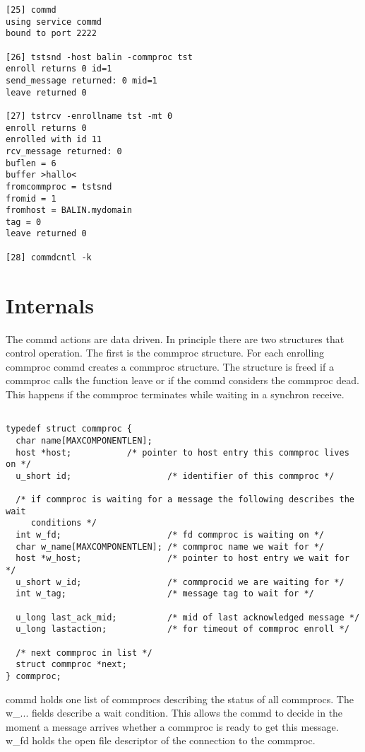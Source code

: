 \begin{verbatim}
[25] commd
using service commd
bound to port 2222

[26] tstsnd -host balin -commproc tst
enroll returns 0 id=1
send_message returned: 0 mid=1
leave returned 0

[27] tstrcv -enrollname tst -mt 0
enroll returns 0
enrolled with id 11
rcv_message returned: 0
buflen = 6
buffer >hallo<
fromcommproc = tstsnd
fromid = 1
fromhost = BALIN.mydomain
tag = 0
leave returned 0

[28] commdcntl -k

\end{verbatim}

\section{Internals}

The commd actions are data driven. In principle there are two structures 
that control operation. The first is the commproc structure. For each 
enrolling commproc commd creates a commproc structure. The structure
is freed if a commproc calls the function leave or if the commd
considers the commproc dead. This happens if the commproc terminates
while waiting in a synchron receive.

\begin{verbatim}

typedef struct commproc {
  char name[MAXCOMPONENTLEN];
  host *host;           /* pointer to host entry this commproc lives on */
  u_short id;                   /* identifier of this commproc */

  /* if commproc is waiting for a message the following describes the wait
     conditions */
  int w_fd;                     /* fd commproc is waiting on */
  char w_name[MAXCOMPONENTLEN]; /* commproc name we wait for */
  host *w_host;                 /* pointer to host entry we wait for */
  u_short w_id;                 /* commprocid we are waiting for */
  int w_tag;                    /* message tag to wait for */

  u_long last_ack_mid;          /* mid of last acknowledged message */
  u_long lastaction;            /* for timeout of commproc enroll */

  /* next commproc in list */
  struct commproc *next;
} commproc;

\end{verbatim}

commd holds one list of commprocs describing the status of all commprocs.
The w\_... fields describe a wait condition. This allows the commd to decide
in the moment a message arrives whether a commproc is ready to get this
message. w\_fd holds the open file descriptor of the connection to the
commproc.   

